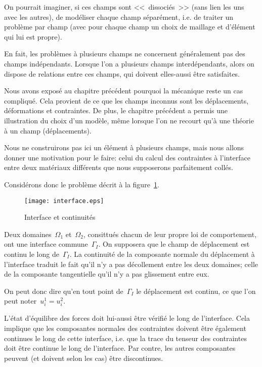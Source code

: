 On pourrait imaginer, si ces champs sont <<~dissociés~>> (sans lien les uns avec les
autres), de modéliser chaque champ séparément, i.e. de traiter un
problème par champ (avec pour chaque champ un choix de maillage et
d'élément qui lui est propre).

En fait, les problèmes à plusieurs champs ne concernent généralement
pas des champs indépendants.
Lorsque l'on a plusieurs champs interdépendants, alors on dispose de relations
entre ces champs, qui doivent elles-aussi être satisfaites.

\medskip
Nous avons exposé au chapitre précédent pourquoi la mécanique reste un cas
compliqué. Cela provient de ce que les champs inconnus sont les déplacements,
déformations et contraintes.
De plus, le chapitre précédent a permis une illustration du choix d'un modèle,
même lorsque l'on ne recourt qu'à une théorie à un champ (déplacements).

\medskip
Nous ne construirons pas ici un élément à plusieurs champs, mais nous
allons donner une motivation pour le faire: celui du calcul des contraintes à
l'interface entre deux matériaux différents que nous supposerons parfaitement
collés.

Considérons donc le problème décrit à la figure~\ref{interf}.
\begin{figure}[ht]
\centering
\texttt{[image: interface.eps]}
\caption{Interface et continuités}\label{interf}
\end{figure}
Deux domaines~$\Omega_1$ et~$\Omega_2$, consittués chacun de leur
propre loi de comportement, ont une interface commune~$\Gamma_I$.
On supposera que le champ de déplacement est continu le long de~$\Gamma_I$.
La continuité de la composante normale du déplacement à l'interface traduit le
fait qu'il n'y a pas décollement entre les deux domaines; celle de la composante
tangentielle qu'il n'y a pas glissement entre eux.

On peut donc dire qu'en tout point de~$\Gamma_I$ le déplacement est
continu, ce que l'on peut noter~$u_i^1=u_i^2$.

\medskip
L'état d'équilibre des forces doit lui-aussi être vérifié le long de l'interface.
Cela implique que les composantes normales des contraintes doivent être également
continues le long de cette interface, i.e. que la trace du tenseur des contraintes doit
être continue le long de l'interface.
Par contre, les autres composantes peuvent (et doivent selon les cas) être
discontinues.

